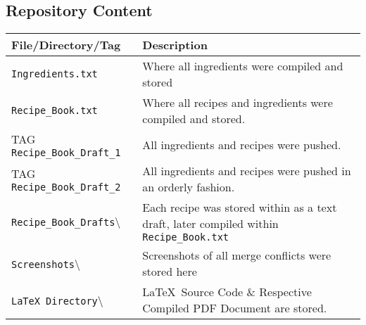 \documentclass[a4paper,twoside,12pt]{article}
\begin{document}
\subsection{Repository Content}
\begin{center}
	\renewcommand{\arraystretch}{1.25}
	\begin{tabular}{ | l | p{7.5cm} |}
		\hline
		File/Directory/Tag & Description \\ \hline
		\texttt{Ingredients.txt} & Where all ingredients were compiled and stored \\ \hline
		\texttt{Recipe\_Book.txt} & Where all recipes and ingredients were compiled and stored. \\ \hline
		TAG \texttt{Recipe\_Book\_Draft\_1} & All ingredients and recipes were pushed. \\ \hline
		TAG \texttt{Recipe\_Book\_Draft\_2} & All ingredients and recipes were pushed in an orderly fashion. \\ \hline
		\texttt{Recipe\_Book\_Drafts}\textbackslash & Each recipe was  stored within as a text draft, later compiled within \texttt{Recipe\_Book.txt} \\ \hline
		\texttt{Screenshots}\textbackslash & Screenshots of all merge conflicts were stored here \\ \hline
		\texttt{LaTeX Directory}\textbackslash & \LaTeX\ Source Code \& Respective Compiled PDF Document are stored. \\ \hline
	\end{tabular}
\end{center}
\end{document}
